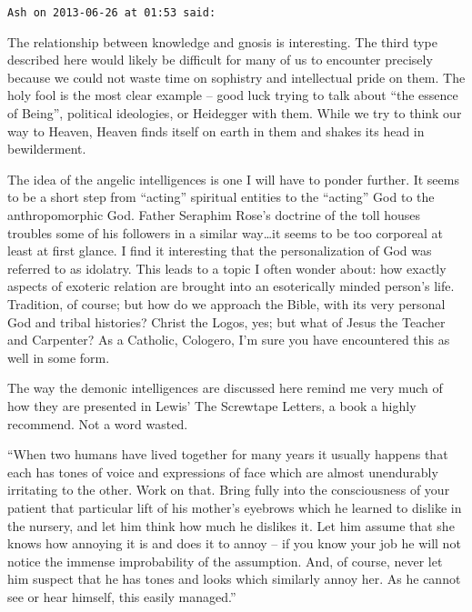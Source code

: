 \begin{footnotesize}\begin{sffamily}



\texttt{Ash on 2013-06-26 at 01:53 said: }

The relationship between knowledge and gnosis is interesting. The third type described here would likely be difficult for many of us to encounter precisely because we could not waste time on sophistry and intellectual pride on them. The holy fool is the most clear example – good luck trying to talk about “the essence of Being”, political ideologies, or Heidegger with them. While we try to think our way to Heaven, Heaven finds itself on earth in them and shakes its head in bewilderment.

The idea of the angelic intelligences is one I will have to ponder further. It seems to be a short step from “acting” spiritual entities to the “acting” God to the anthropomorphic God. Father Seraphim Rose's doctrine of the toll houses troubles some of his followers in a similar way…it seems to be too corporeal at least at first glance. I find it interesting that the personalization of God was referred to as idolatry. This leads to a topic I often wonder about: how exactly aspects of exoteric relation are brought into an esoterically minded person's life. Tradition, of course; but how do we approach the Bible, with its very personal God and tribal histories? Christ the Logos, yes; but what of Jesus the Teacher and Carpenter? As a Catholic, Cologero, I'm sure you have encountered this as well in some form. 

The way the demonic intelligences are discussed here remind me very much of how they are presented in Lewis' The Screwtape Letters, a book a highly recommend. Not a word wasted.

“When two humans have lived together for many years it usually happens that each has tones of voice and expressions of face which are almost unendurably irritating to the other. Work on that. Bring fully into the consciousness of your patient that particular lift of his mother's eyebrows which he learned to dislike in the nursery, and let him think how much he dislikes it. Let him assume that she knows how annoying it is and does it to annoy – if you know your job he will not notice the immense improbability of the assumption. And, of course, never let him suspect that he has tones and looks which similarly annoy her. As he cannot see or hear himself, this easily managed.” 


\end{sffamily}
\end{footnotesize}

